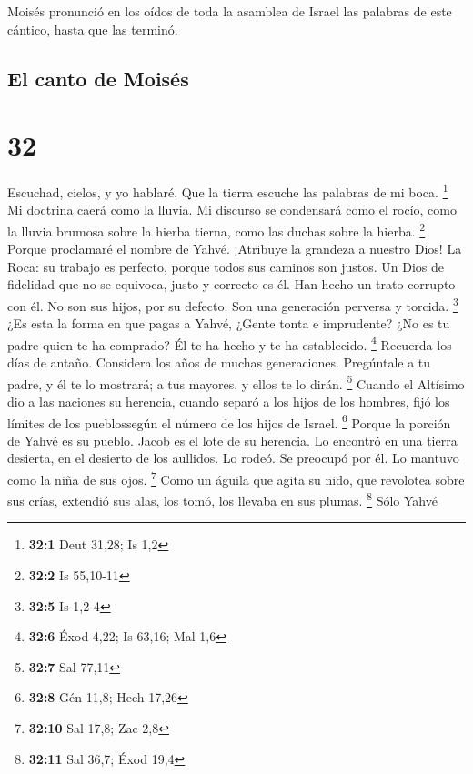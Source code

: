  Moisés pronunció en los oídos de toda la asamblea de
Israel las palabras de este cántico, hasta que las terminó.

\hypertarget{el-canto-de-moisuxe9s}{%
\subsection{El canto de Moisés}\label{el-canto-de-moisuxe9s}}

\hypertarget{section-31}{%
\section{32}\label{section-31}}

 Escuchad, cielos, y yo hablaré. Que la tierra escuche las
palabras de mi boca. \footnote{\textbf{32:1} Deut 31,28; Is 1,2}
 Mi doctrina caerá como la lluvia. Mi discurso se
condensará como el rocío, como la lluvia brumosa sobre la hierba tierna,
como las duchas sobre la hierba. \footnote{\textbf{32:2} Is 55,10-11}
 Porque proclamaré el nombre de Yahvé. ¡Atribuye la
grandeza a nuestro Dios!  La Roca: su trabajo es perfecto,
porque todos sus caminos son justos. Un Dios de fidelidad que no se
equivoca, justo y correcto es él.  Han hecho un trato
corrupto con él. No son sus hijos, por su defecto. Son una generación
perversa y torcida. \footnote{\textbf{32:5} Is 1,2-4}  ¿Es
esta la forma en que pagas a Yahvé, ¿Gente tonta e imprudente? ¿No es tu
padre quien te ha comprado? Él te ha hecho y te ha establecido.
\footnote{\textbf{32:6} Éxod 4,22; Is 63,16; Mal 1,6} 
Recuerda los días de antaño. Considera los años de muchas generaciones.
Pregúntale a tu padre, y él te lo mostrará; a tus mayores, y ellos te lo
dirán. \footnote{\textbf{32:7} Sal 77,11}  Cuando el
Altísimo dio a las naciones su herencia, cuando separó a los hijos de
los hombres, fijó los límites de los pueblossegún el número de los hijos
de Israel. \footnote{\textbf{32:8} Gén 11,8; Hech 17,26} 
Porque la porción de Yahvé es su pueblo. Jacob es el lote de su
herencia.  Lo encontró en una tierra desierta, en el
desierto de los aullidos. Lo rodeó. Se preocupó por él. Lo mantuvo como
la niña de sus ojos. \footnote{\textbf{32:10} Sal 17,8; Zac 2,8}
 Como un águila que agita su nido, que revolotea sobre
sus crías, extendió sus alas, los tomó, los llevaba en sus plumas.
\footnote{\textbf{32:11} Sal 36,7; Éxod 19,4}  Sólo Yahvé
